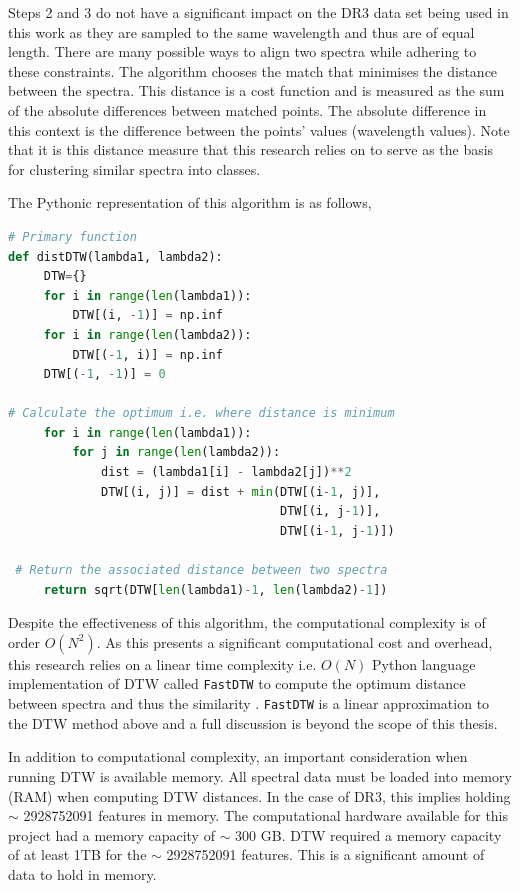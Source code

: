Steps 2 and 3 do not have a significant impact on the DR3 data set being used in this work as they are sampled to the same wavelength and thus are of equal length. There are many possible ways to align two spectra while adhering to these constraints. The algorithm chooses the match that minimises the distance between the spectra. This distance is a cost function and is measured as the sum of the absolute differences between matched points. The absolute difference in this context is the difference between the points' values (wavelength values). Note that it is this distance measure that this research relies on to serve as the basis for clustering similar spectra into classes.

The Pythonic representation of this algorithm is as follows,

\begin{lstlisting}[language=Python]
# Primary function
def distDTW(lambda1, lambda2):
     DTW={}
     for i in range(len(lambda1)):
         DTW[(i, -1)] = np.inf
     for i in range(len(lambda2)):
         DTW[(-1, i)] = np.inf
     DTW[(-1, -1)] = 0
 
# Calculate the optimum i.e. where distance is minimum
     for i in range(len(lambda1)):
         for j in range(len(lambda2)):
             dist = (lambda1[i] - lambda2[j])**2
             DTW[(i, j)] = dist + min(DTW[(i-1, j)],
                                      DTW[(i, j-1)], 
                                      DTW[(i-1, j-1)])
 
 # Return the associated distance between two spectra
     return sqrt(DTW[len(lambda1)-1, len(lambda2)-1])
\end{lstlisting}

Despite the effectiveness of this algorithm, the computational complexity is of order $O(N^2)$. As this presents a significant computational cost and overhead, this research relies on a linear time complexity i.e. $O(N)$ Python language implementation of DTW called \texttt{FastDTW} to compute the optimum distance between spectra and thus the similarity \cite{salvador2007toward}. \texttt{FastDTW} is a linear approximation to the DTW method above and a full discussion is beyond the scope of this thesis. 

In addition to computational complexity, an important consideration when running DTW is available memory. All spectral data must be loaded into memory (RAM) when computing DTW distances. In the case of DR3, this implies holding $\sim$ \num[round-precision=2,round-mode=figures, scientific-notation=true]{2928752091} features in memory. The computational hardware available for this project had a memory capacity of $\sim$ 300 GB. DTW required a memory capacity of at least 1TB for the $\sim$ \num[round-precision=2,round-mode=figures, scientific-notation=true]{2928752091} features. This is a significant amount of data to hold in memory. 

